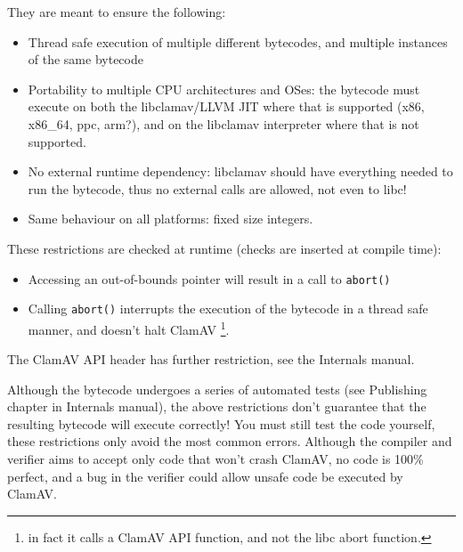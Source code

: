 They are meant to ensure the following:
\begin{itemize}
 \item Thread safe execution of multiple different bytecodes, and multiple instances of the same bytecode
 \item Portability to multiple CPU architectures and OSes: the bytecode must execute on both the libclamav/LLVM JIT where that is supported (x86, x86\_64, ppc, arm?),
and on the libclamav interpreter where that is not supported.
 \item No external runtime dependency: libclamav should have everything needed to run the bytecode, thus no external calls are allowed, not even to libc!
 \item Same behaviour on all platforms: fixed size integers. 
\end{itemize}

These restrictions are checked at runtime (checks are inserted at compile time):
\begin{itemize}
 \item Accessing an out-of-bounds pointer will result in a call to \verb+abort()+
 \item Calling \verb+abort()+ interrupts the execution of the bytecode in a thread safe manner, and doesn't halt ClamAV
\footnote{in fact it calls a ClamAV API function, and not the libc abort function.}.
\end{itemize}

The ClamAV API header has further restriction, see the Internals manual.

Although the bytecode undergoes a series of automated tests (see Publishing chapter in Internals manual), the above restrictions don't guarantee
that the resulting bytecode will execute correctly!
You must still test the code yourself, these restrictions only avoid the most common errors.
Although the compiler and verifier aims to accept only code that won't crash ClamAV, no code is 100\% perfect, and a bug in the verifier
could allow unsafe code be executed by ClamAV.

